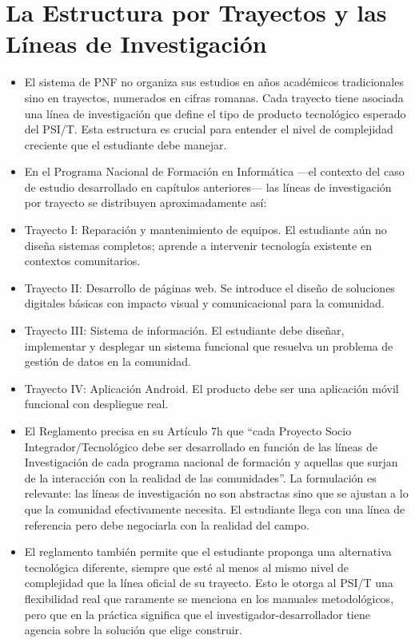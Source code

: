 \documentclass[14pt,a4paper,oneside]{extbook}
\begin{document}
\section{La Estructura por Trayectos y las Líneas de Investigación}
\begin{itemize}
\item El sistema de PNF no organiza sus estudios en años académicos tradicionales sino en trayectos, numerados en cifras romanas. Cada trayecto tiene asociada una línea de investigación que define el tipo de producto tecnológico esperado del PSI/T. Esta estructura es crucial para entender el nivel de complejidad creciente que el estudiante debe manejar.
\item En el Programa Nacional de Formación en Informática ---el contexto del caso de estudio desarrollado en capítulos anteriores--- las líneas de investigación por trayecto se distribuyen aproximadamente así:
\item Trayecto I:  Reparación y mantenimiento de equipos. El estudiante aún no diseña sistemas completos; aprende a intervenir tecnología existente en contextos comunitarios.
\item Trayecto II:  Desarrollo de páginas web. Se introduce el diseño de soluciones digitales básicas con impacto visual y comunicacional para la comunidad.
\item Trayecto III:  Sistema de información. El estudiante debe diseñar, implementar y desplegar un sistema funcional que resuelva un problema de gestión de datos en la comunidad.
\item Trayecto IV:  Aplicación Android. El producto debe ser una aplicación móvil funcional con despliegue real.
\item El Reglamento precisa en su Artículo 7h que \enquote{cada Proyecto Socio Integrador/Tecnológico debe ser desarrollado en función de las líneas de Investigación de cada programa nacional de formación y aquellas que surjan de la interacción con la realidad de las comunidades}. La formulación es relevante: las líneas de investigación no son abstractas sino que se ajustan a lo que la comunidad efectivamente necesita. El estudiante llega con una línea de referencia pero debe negociarla con la realidad del campo.
\item El reglamento también permite que el estudiante proponga una alternativa tecnológica diferente, siempre que esté al menos al mismo nivel de complejidad que la línea oficial de su trayecto. Esto le otorga al PSI/T una flexibilidad real que raramente se menciona en los manuales metodológicos, pero que en la práctica significa que el investigador-desarrollador tiene agencia sobre la solución que elige construir.
\end{itemize}
\end{document}
